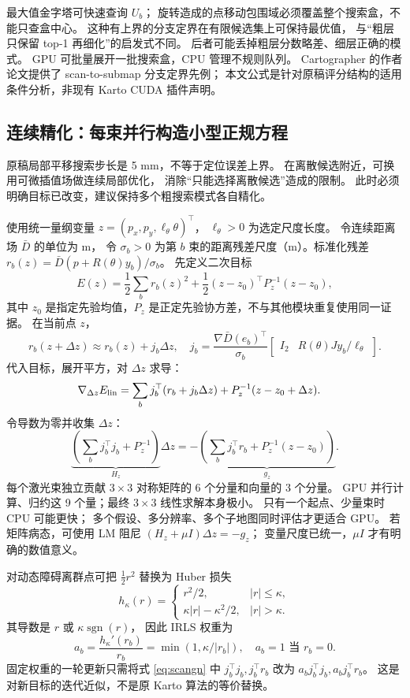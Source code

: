 最大值金字塔可快速查询 $U_b$；
旋转造成的点移动包围域必须覆盖整个搜索盒，不能只查盒中心。
这种有上界的分支定界在有限候选集上可保持最优值，
与“粗层只保留 top-1 再细化”的启发式不同。
后者可能丢掉粗层分数略差、细层正确的模式。
GPU 可批量展开一批搜索盒，CPU 管理不规则队列。
Cartographer 的作者论文提供了 scan-to-submap 分支定界先例\cite{cartographer}；
本文公式是针对原稿评分结构的适用条件分析，非现有 Karto CUDA 插件声明。

\subsection{连续精化：每束并行构造小型正规方程}
原稿局部平移搜索步长是 5 mm，不等于定位误差上界。
在离散候选附近，可换用可微插值场做连续局部优化，
消除“只能选择离散候选”造成的限制。
此时必须明确目标已改变，建议保持多个粗搜索模式各自精化。

使用统一量纲变量 $z=(p_x,p_y,\ell_\theta\theta)^\top$，
$\ell_\theta>0$ 为选定尺度长度。
令连续距离场 $\bar D$ 的单位为 m，
令 $\sigma_b>0$ 为第 $b$ 束的距离残差尺度（m）。标准化残差
$r_b(z)=\bar D(p+R(\theta)y_b)/\sigma_b$。
先定义二次目标
\begin{equation}
E(z)=\frac12\sum_b r_b(z)^2+
\frac12(z-z_0)^\top P_z^{-1}(z-z_0),
\label{eq:scanls}
\end{equation}
其中 $z_0$ 是指定先验均值，$P_z$ 是正定先验协方差，不与其他模块重复使用同一证据。
在当前点 $z$，
\[
r_b(z+\Delta z)\approx r_b(z)+j_b\Delta z,\quad
j_b=\frac{\nabla\bar D(e_b)^\top}{\sigma_b}
\begin{bmatrix}I_2&R(\theta)Jy_b/\ell_\theta\end{bmatrix}.
\]
代入目标，展开平方，对 $\Delta z$ 求导：
\begin{align}
\nabla_{\Delta z}E_{\rm lin}
&=\sum_bj_b^\top(r_b+j_b\Delta z)
+P_z^{-1}(z-z_0+\Delta z).
\end{align}
令导数为零并收集 $\Delta z$：
\begin{equation}
\underbrace{\left(\sum_bj_b^\top j_b+P_z^{-1}\right)}_{H_z}
\Delta z
=-\underbrace{\left(\sum_bj_b^\top r_b+P_z^{-1}(z-z_0)\right)}_{g_z}.
\label{eq:scangn}
\end{equation}
每个激光束独立贡献 $3\times3$ 对称矩阵的 6 个分量和向量的 3 个分量。
GPU 并行计算、归约这 9 个量；最终 $3\times3$ 线性求解本身极小。
只有一个起点、少量束时 CPU 可能更快；
多个假设、多分辨率、多个子地图同时评估才更适合 GPU。
若矩阵病态，可使用 LM 阻尼 $(H_z+\mu I)\Delta z=-g_z$；
变量尺度已统一，$\mu I$ 才有明确的数值意义。

对动态障碍离群点可把 $\frac12r^2$ 替换为 Huber 损失
\[
h_\kappa(r)=
\begin{cases}
r^2/2,&|r|\le\kappa,\\
\kappa|r|-\kappa^2/2,&|r|>\kappa.
\end{cases}
\]
其导数是 $r$ 或 $\kappa\operatorname{sgn}(r)$，
因此 IRLS 权重为
\[
a_b=\frac{h_\kappa'(r_b)}{r_b}
=\min(1,\kappa/|r_b|),\quad a_b=1\text{ 当 }r_b=0.
\]
固定权重的一轮更新只需将式 \eqref{eq:scangn} 中
$j_b^\top j_b,j_b^\top r_b$ 改为 $a_bj_b^\top j_b,a_bj_b^\top r_b$。
这是对新目标的迭代近似，不是原 Karto 算法的等价替换。

